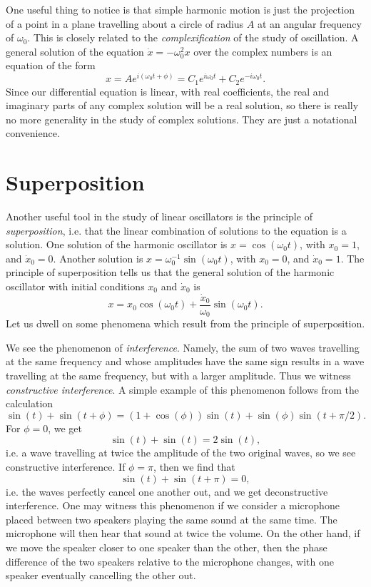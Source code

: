 %
One useful thing to notice is that simple harmonic motion is just the projection of a point in a plane travelling about a circle of radius $A$ at an angular frequency of $\omega_0$. This is closely related to the \emph{complexification} of the study of oscillation. A general solution of the equation $\dot{x} = - \omega_0^2 x$ over the complex numbers is an equation of the form
%
\[ x = A e^{i (\omega_0 t + \phi)} = C_1 e^{i \omega_0 t} + C_2 e^{-i \omega_0 t}. \]
%
Since our differential equation is linear, with real coefficients, the real and imaginary parts of any complex solution will be a real solution, so there is really no more generality in the study of complex solutions. They are just a notational convenience.

\section{Superposition}

Another useful tool in the study of linear oscillators is the principle of \emph{superposition}, i.e. that the linear combination of solutions to the equation is a solution. One solution of the harmonic oscillator is $x = \cos(\omega_0 t)$, with $x_0 = 1$, and $\dot{x}_0 = 0$. Another solution is $x = \omega_0^{-1} \sin(\omega_0 t)$, with $x_0 = 0$, and $\dot{x}_0 = 1$. The principle of superposition tells us that the general solution of the harmonic oscillator with initial conditions $x_0$ and $\dot{x}_0$ is
%
\[ x = x_0 \cos(\omega_0 t) + \frac{\dot{x}_0}{\omega_0} \sin(\omega_0 t). \]
%
Let us dwell on some phenomena which result from the principle of superposition.

We see the phenomenon of \emph{interference}. Namely, the sum of two waves travelling at the same frequency and whose amplitudes have the same sign results in a wave travelling at the same frequency, but with a larger amplitude. Thus we witness \emph{constructive interference}. A simple example of this phenomenon follows from the calculation
%
\[ \sin(t) + \sin(t + \phi) = (1 + \cos(\phi)) \sin(t) + \sin(\phi) \sin(t + \pi/2). \]
%
For $\phi = 0$, we get
%
\[ \sin(t) + \sin(t) = 2 \sin(t), \]
%
i.e. a wave travelling at twice the amplitude of the two original waves, so we see constructive interference. If $\phi = \pi$, then we find that
%
\[ \sin(t) + \sin(t + \pi) = 0, \]
%
i.e. the waves perfectly cancel one another out, and we get deconstructive interference. One may witness this phenomenon if we consider a microphone placed between two speakers playing the same sound at the same time. The microphone will then hear that sound at twice the volume. On the other hand, if we move the speaker closer to one speaker than the other, then the phase difference of the two speakers relative to the microphone changes, with one speaker eventually cancelling the other out.

